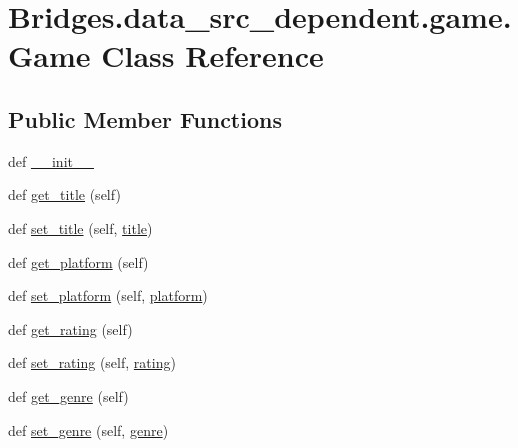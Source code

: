\hypertarget{class_bridges_1_1data__src__dependent_1_1game_1_1_game}{}\section{Bridges.\+data\+\_\+src\+\_\+dependent.\+game.\+Game Class Reference}
\label{class_bridges_1_1data__src__dependent_1_1game_1_1_game}
\subsection*{Public Member Functions}
\begin{DoxyCompactItemize}
\item 
def \hyperlink{class_bridges_1_1data__src__dependent_1_1game_1_1_game_a798a982ea693617978d1c298d010bda7}{\+\_\+\+\_\+init\+\_\+\+\_\+}
\item 
def \hyperlink{class_bridges_1_1data__src__dependent_1_1game_1_1_game_aaa592a6059ea48ca25b1e0f250edbf81}{get\+\_\+title} (self)
\item 
def \hyperlink{class_bridges_1_1data__src__dependent_1_1game_1_1_game_a70be3bbd3fc1e69c4a5a950e2f8b25f8}{set\+\_\+title} (self, \hyperlink{class_bridges_1_1data__src__dependent_1_1game_1_1_game_a069ae1bf92787da16e7194c46bb1da48}{title})
\item 
def \hyperlink{class_bridges_1_1data__src__dependent_1_1game_1_1_game_a41fabe0581cd8829e179f4beaec3822e}{get\+\_\+platform} (self)
\item 
def \hyperlink{class_bridges_1_1data__src__dependent_1_1game_1_1_game_a831013a3129582f35a308d4e385ffd06}{set\+\_\+platform} (self, \hyperlink{class_bridges_1_1data__src__dependent_1_1game_1_1_game_a0730c93ed3ffa8015d75b9ac950ce755}{platform})
\item 
def \hyperlink{class_bridges_1_1data__src__dependent_1_1game_1_1_game_ade58a9513f71891b603f136c903a7205}{get\+\_\+rating} (self)
\item 
def \hyperlink{class_bridges_1_1data__src__dependent_1_1game_1_1_game_a10af1184915e1a93802b5b54cbf5318d}{set\+\_\+rating} (self, \hyperlink{class_bridges_1_1data__src__dependent_1_1game_1_1_game_a273b1dc64cf417482d87c88b76eba882}{rating})
\item 
def \hyperlink{class_bridges_1_1data__src__dependent_1_1game_1_1_game_ad523f2f83f703b3498d2010b38ccd2d3}{get\+\_\+genre} (self)
\item 
def \hyperlink{class_bridges_1_1data__src__dependent_1_1game_1_1_game_a3381f396d151e4d944b3358e73dad2b3}{set\+\_\+genre} (self, \hyperlink{class_bridges_1_1data__src__dependent_1_1game_1_1_game_a13b082829b9f8c468c752b8ce6d64a77}{genre})
\end{DoxyCompactItemize}
